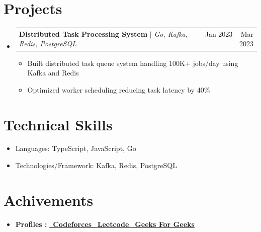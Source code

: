 \documentclass[letterpaper,11pt]{article}
\makeatletter
\newcommand{\resumeItem}[1]{
  \item\small{
    {#1 \vspace{-2pt}}
  }
}
\newcommand{\resumeProjectHeading}[2]{
    \item
    \begin{tabular*}{0.97\textwidth}{l@{\extracolsep{\fill}}r}
      \small#1 & #2 \\
    \end{tabular*}\vspace{-7pt}
}
\newcommand{\resumeSubItem}[1]{\resumeItem{#1}\vspace{-4pt}}
\newcommand{\resumeSubHeadingListStart}{\begin{itemize}[leftmargin=0.15in, label={}]}
\newcommand{\resumeSubHeadingListEnd}{\end{itemize}}
\newcommand{\resumeItemListStart}{\begin{itemize}}
\newcommand{\resumeItemListEnd}{\end{itemize}\vspace{-5pt}}
\makeatother
\begin{document}
\section{Projects}
\resumeSubHeadingListStart

\resumeProjectHeading{\textbf{Distributed Task Processing System} $|$ \emph{Go, Kafka, Redis, PostgreSQL}}{Jan 2023 – Mar 2023}

\resumeItemListStart
\resumeItem{Built distributed task queue system handling 100K+ jobs/day using Kafka and Redis}
\resumeItem{Optimized worker scheduling reducing task latency by 40\%}
\resumeItemListEnd

\resumeSubHeadingListEnd

\section{Technical Skills}
	\resumeSubHeadingListStart
        \resumeSubItem{Languages: TypeScript, JavaScript, Go}
        \resumeSubItem{Technologies/Framework: Kafka, Redis, PostgreSQL}
        \resumeSubHeadingListEnd
\vspace{-5pt}
\vspace{-7pt}
\section{Achivements}
  \resumeSubHeadingListStart

      \resumeItemListStart
       \resumeItem{Received awards from amazon and cvent at multiple instances for outstanding performances and begin a team player}
        \resumeItem{Rated in Top 2\% of \textbf{Leetcode} in a pool of 350000 users.}
        \resumeItem{\textbf{Expert} on \textbf{Codeforces}, \textbf{Rating : 1611}}
      \resumeItemListEnd
      \vspace{-5pt}
    \resumeItem{\textbf{Profiles :}
    \href{https://codeforces.com/profile/noob_tusharb}{\ {\textbf{Codeforces }}}}{}\href{https://leetcode.com/noob_tusharb/}{\ \textbf{Leetcode} }{} \href{https://auth.geeksforgeeks.org/user/tusharextra75/practice/}{\ {\textbf{Geeks For Geeks}}} 
    \resumeSubHeadingListEnd
    \vspace{-10pt}
\end{document}

